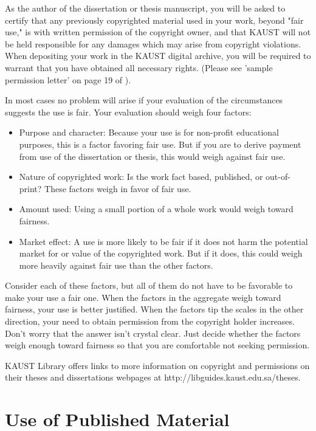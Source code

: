 As the author of the dissertation or thesis manuscript, you will be asked to certify that any previously copyrighted material used in your work, beyond "fair use," is with written permission of the copyright owner, and that KAUST will not be held responsible for any damages which may arise from copyright violations.  When depositing your work in the KAUST digital archive, you will be required to warrant that you have obtained all necessary rights. (Please see 'sample permission letter' on page 19 of \cite{guidelines}).

In most cases no problem will arise if your evaluation of the circumstances suggests the use is fair. Your evaluation should weigh four factors:

\begin{itemize}
\item Purpose and character: Because your use is for non-profit educational purposes, this is a factor favoring fair use. But if you are to derive payment from use of the dissertation or thesis, this would weigh against fair use.
\item Nature of copyrighted work: Is the work fact based, published, or out-of-print? These factors weigh in favor of fair use.
\item Amount used:  Using a small portion of a whole work would weigh toward fairness.
\item Market effect: A use is more likely to be fair if it does not harm the potential market for or value of the copyrighted work. But if it does, this could weigh more heavily against fair use than the other factors.
\end{itemize}

Consider each of these factors, but all of them do not have to be favorable to make your use a fair one. When the factors in the aggregate weigh toward fairness, your use is better justified. When the factors tip the scales in the other direction, your need to obtain permission from the copyright holder increases. Don't worry that the answer isn't crystal clear. Just decide whether the factors weigh enough toward fairness so that you are comfortable not seeking permission.

KAUST Library offers links to more information on copyright and permissions on their theses and dissertations webpages at http://libguides.kaust.edu.sa/theses.

\section{Use of Published Material}

